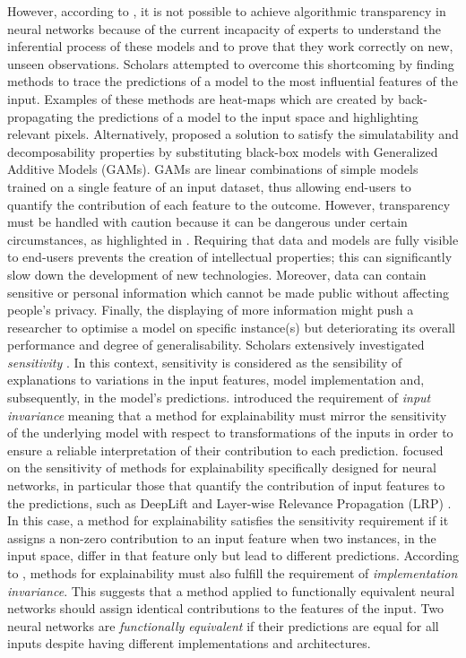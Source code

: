 \documentclass[final,1p,times]{elsarticle}
\begin{document}
However, according to \cite{lipton2018mythos}, it is not possible to achieve algorithmic transparency in neural networks because of the current incapacity of experts to understand the inferential process of these models and to prove that they work correctly on new, unseen observations. Scholars attempted to overcome this shortcoming by finding methods to trace the predictions of a model to the most influential features of the input. Examples of these methods are heat-maps \cite{simonyan2014deep} which are created by back-propagating the predictions of a model to the input space and highlighting relevant pixels. Alternatively, \cite{lou2012intelligible} proposed a solution to satisfy the simulatability and decomposability properties by substituting black-box models with Generalized Additive Models (GAMs). GAMs are linear combinations of simple models trained on a single feature of an input dataset, thus allowing end-users to quantify the contribution of each feature to the outcome. 
However, transparency must be handled with caution because it can be dangerous under certain circumstances, as highlighted in \cite{weller2017challenges}. Requiring that data and models are fully visible to end-users prevents the creation of intellectual properties; this can significantly slow down the development of new technologies. Moreover, data can contain sensitive or personal information which cannot be made public without affecting people's privacy. Finally, the displaying of more information might push a researcher to optimise a model on specific instance(s) but deteriorating its overall performance and degree of generalisability.
Scholars extensively investigated \textit{sensitivity} \cite{kindermans2017reliability, sundararajan2017axiomatic}. In this context, sensitivity is considered as the sensibility of explanations to variations in the input features, model implementation and, subsequently, in the model's predictions. \cite{kindermans2017reliability} introduced the requirement of \textit{input invariance} meaning that a method for explainability must mirror the sensitivity of the underlying model with respect to transformations of the inputs in order to ensure a reliable interpretation of their contribution to each prediction. \cite{sundararajan2017axiomatic} focused on the sensitivity of methods for explainability specifically designed for neural networks, in particular those that quantify the contribution of input features to the predictions, such as DeepLift \cite{shrikumar2017learning} and Layer-wise Relevance Propagation (LRP) \cite{bach2015pixel}. In this case, a method for explainability satisfies the sensitivity requirement if it assigns a non-zero contribution to an input feature when two instances, in the input space, differ in that feature only but lead to different predictions. According to \cite{sundararajan2017axiomatic}, methods for explainability must also fulfill the requirement of \textit{implementation invariance}. This suggests that a method applied to functionally equivalent neural networks should assign identical contributions to the features of the input. Two neural networks are \textit{functionally equivalent} if their predictions are equal for all inputs despite having different implementations and architectures.
\end{document}
